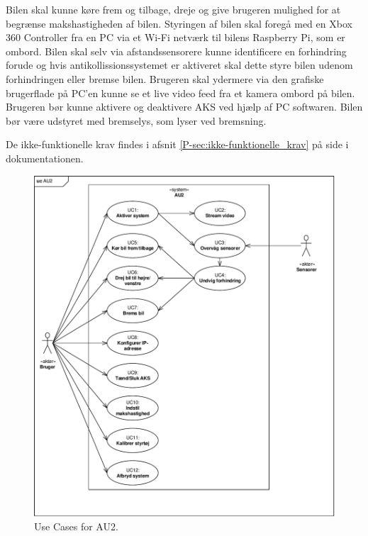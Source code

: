 Bilen skal kunne køre frem og tilbage, dreje og give brugeren mulighed for at begrænse makshastigheden af bilen. 
Styringen af bilen skal foregå med en Xbox 360 Controller fra en PC via et Wi-Fi netværk til bilens Raspberry Pi, som er ombord.
Bilen skal selv via afstandssensorere kunne identificere en forhindring forude og hvis antikollissionssystemet er aktiveret skal dette styre bilen udenom forhindringen eller bremse bilen.
Brugeren skal ydermere via den grafiske brugerflade på PC'en kunne se et live video feed fra et kamera ombord på bilen.
Brugeren bør kunne aktivere og deaktivere AKS ved hjælp af PC softwaren.
Bilen bør være udstyret med bremselys, som lyser ved bremsning.

De ikke-funktionelle krav findes i afsnit \ref{P-sec:ikke-funktionelle_krav}  på side \pageref{P-sec:ikke-funktionelle_krav} i dokumentationen.

\clearpage

\begin{figure}[h]
\centering
\includegraphics[width=\textwidth]{../fig/diagrammer/uc_au2}
\caption{Use Cases for AU2.}
\label{fig:use_cases}
\end{figure}